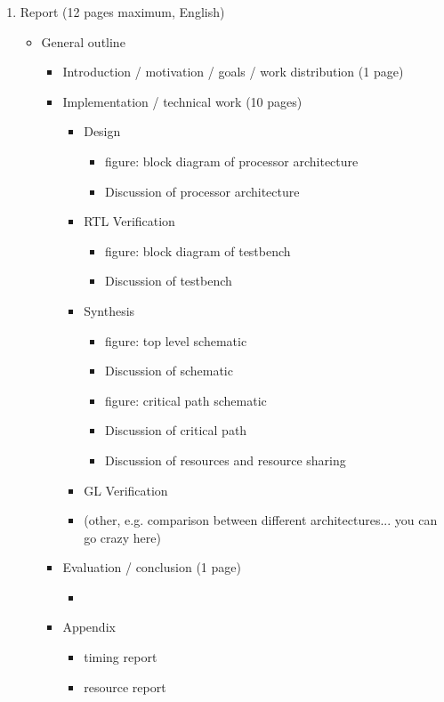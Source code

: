 \begin{enumerate}
	\item Report (12 pages maximum, English)
		\begin{itemize}
		\item General outline
			\begin{itemize}		 
			\item Introduction / motivation / goals / work distribution (1 page)
			\item Implementation / technical work (10 pages)
				\begin{itemize}
				\item Design
					\begin{itemize}
					\item figure: block diagram of processor architecture
					\item Discussion of processor architecture
					\end{itemize}					
				\item RTL Verification
					\begin{itemize}
					\item figure: block diagram of testbench
					\item Discussion of testbench
					\end{itemize}		
				\item Synthesis
					\begin{itemize}
					\item figure: top level schematic
					\item Discussion of schematic
					\item figure: critical path schematic 
					\item Discussion of critical path 
					\item Discussion of resources and resource sharing
					\end{itemize}				
				\item GL Verification
				\item (other, e.g. comparison between different architectures... you can go crazy here)
				\end{itemize}		 
			\item Evaluation / conclusion (1 page)
				\begin{itemize}
				\item 
				\end{itemize}
			\item Appendix
				\begin{itemize}
				\item timing report
				\item resource report

\end{itemize}
\end{itemize}
\end{itemize}
\end{enumerate}
